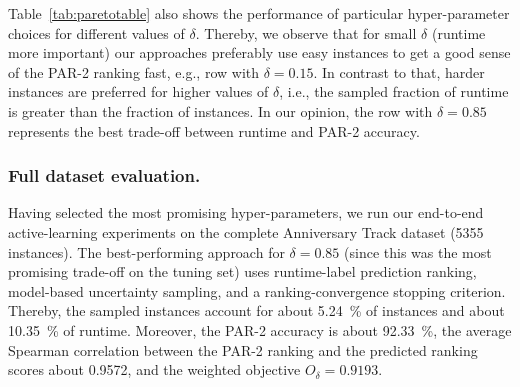 \documentclass[runningheads]{llncs}
\begin{document}
Table~\ref{tab:paretotable} also shows the performance of particular hyper-parameter choices for different values of $\delta$.
Thereby, we observe that for small $\delta$ (runtime more important) our approaches preferably use easy instances to get a good sense of the PAR-2 ranking fast, e.g., row with $\delta = 0.15$.
In contrast to that, harder instances are preferred for higher values of $\delta$, i.e., the sampled fraction of runtime is greater than the fraction of instances.
In our opinion, the row with $\delta = 0.85$ represents the best trade-off between runtime and PAR-2 accuracy.

\subsubsection{Full dataset evaluation.}
Having selected the most promising hyper-parameters, we run our end-to-end active-learning experiments on the complete Anniversary Track dataset (5355 instances).
The best-performing approach for $\delta = 0.85$ (since this was the most promising trade-off on the tuning set) uses runtime-label prediction ranking, model-based uncertainty sampling, and a ranking-convergence stopping criterion.
Thereby, the sampled instances account for about \SI{5.24}{\%} of instances and about \SI{10.35}{\%} of runtime.
Moreover, the PAR-2 accuracy is about \SI{92.33}{\%}, the average Spearman correlation between the PAR-2 ranking and the predicted ranking scores about \SI{0.9572}{}, and the weighted objective $O_{\delta} = 0.9193$.
\end{document}
